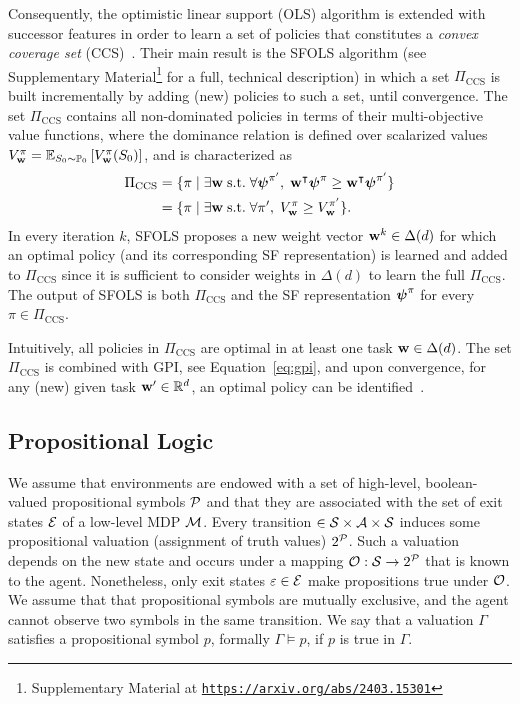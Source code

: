  Consequently, the optimistic linear support (OLS) algorithm is extended with successor features in order to learn a set of policies that constitutes a \textit{convex coverage set} (CCS)~\citep{Roijers2015}. Their main result is the SFOLS algorithm (see Supplementary Material\footnote{Supplementary Material at {\texttt{\url{https://arxiv.org/abs/2403.15301}}}} for a full, technical description) in which a set $\Pi_\text{CCS}$ is built incrementally by adding (new) policies to such a set, until convergence. The set $\Pi_\text{CCS}$ contains all non-dominated policies in terms of their multi-objective value functions, where the dominance relation is defined over scalarized values ${V^\pi_{\mathbf{w}} = \mathbb{E}_{S_0\sim\mathbb{P}_0}\left[V^\pi_{\mathbf{w}}(S_0)\right]}$, and is characterized as
\begin{align}
  \Pi_\text{CCS} &= \{\pi\;\lvert\;\exists\mathbf{w}\;\text{s.t.}\;\forall {\boldsymbol{\mathbf{\psi}}}^{\pi'},\; \mathbf{w}^\intercal {\boldsymbol{\mathbf{\psi}}}^\pi {\;\geq\;} \mathbf{w}^\intercal{\boldsymbol{\mathbf{\psi}}}^{\pi'} \} \nonumber\\
  &= \{ \pi \;\lvert\;\exists\mathbf{w}\;\text{s.t.}\;\forall {\pi'},\; {V^\pi_{\mathbf{w}}}{\;\geq\;} {V^{\pi'}_{\mathbf{w}}}\}.
\end{align} 
In every iteration $k$, SFOLS proposes a new weight vector $\mathbf{w}^k\in\Delta(d)$ for which an optimal policy (and its corresponding SF representation) is learned and added to $\Pi_\text{CCS}$ since it is sufficient to consider weights in $\Delta(d)$ to learn the full $\Pi_\text{CCS}$. The output of SFOLS is both $\Pi_\text{CCS}$ and the SF representation $\boldsymbol{\mathbf{\psi}}^\pi$ for every $\pi\in\Pi_\text{CCS}$.
 
Intuitively, all policies in $\Pi_\text{CCS}$ are optimal in at least one task $\mathbf{w} \in \Delta(d)$.
The set $\Pi_\text{CCS}$ is combined with GPI, see Equation~\eqref{eq:gpi}, and upon convergence, for any (new) given task $\mathbf{w}'\in\mathbb{R}^d$, an optimal policy can be identified~\citep[cf. Theorem 2]{Alegre2022}.


\subsection{Propositional Logic}
We assume that environments are endowed with a set of high-level, boolean-valued propositional symbols $\mathcal{P}$ and that they are associated with the set of exit states $\mathcal{E}$ of a low-level MDP $\mathcal{M}$. Every transition $\in\mathcal{S}\times\mathcal{A}\times\mathcal{S}$ induces some propositional valuation (assignment of truth values) $2^{\mathcal{P}}$. Such a valuation depends on the new state and occurs under a mapping ${\mathcal{O}:\mathcal{S}\rightarrow2^{\mathcal{P}}}$ that is known to the agent. Nonetheless, only exit states $\varepsilon\in\mathcal{E}$ make propositions true under $\mathcal{O}$. We assume that that propositional symbols are mutually exclusive, and the agent cannot observe two symbols in the same transition. We say that a valuation $\Gamma$ satisfies a propositional symbol $p$, formally $\Gamma\vDash p$, if $p$ is true in $\Gamma$. 

